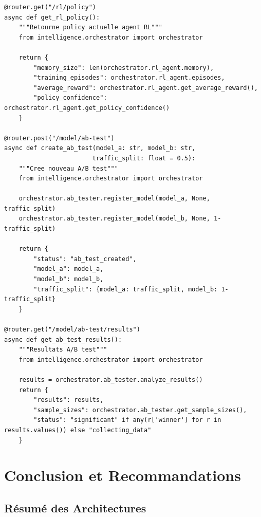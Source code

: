 \documentclass[12pt,a4paper]{article}
\begin{document}
\begin{lstlisting}[caption={api/intelligent\_routes.py}]
@router.get("/rl/policy")
async def get_rl_policy():
    """Retourne policy actuelle agent RL"""
    from intelligence.orchestrator import orchestrator
    
    return {
        "memory_size": len(orchestrator.rl_agent.memory),
        "training_episodes": orchestrator.rl_agent.episodes,
        "average_reward": orchestrator.rl_agent.get_average_reward(),
        "policy_confidence": orchestrator.rl_agent.get_policy_confidence()
    }

@router.post("/model/ab-test")
async def create_ab_test(model_a: str, model_b: str, 
                        traffic_split: float = 0.5):
    """Cree nouveau A/B test"""
    from intelligence.orchestrator import orchestrator
    
    orchestrator.ab_tester.register_model(model_a, None, traffic_split)
    orchestrator.ab_tester.register_model(model_b, None, 1-traffic_split)
    
    return {
        "status": "ab_test_created",
        "model_a": model_a,
        "model_b": model_b,
        "traffic_split": {model_a: traffic_split, model_b: 1-traffic_split}
    }

@router.get("/model/ab-test/results")
async def get_ab_test_results():
    """Resultats A/B test"""
    from intelligence.orchestrator import orchestrator
    
    results = orchestrator.ab_tester.analyze_results()
    return {
        "results": results,
        "sample_sizes": orchestrator.ab_tester.get_sample_sizes(),
        "status": "significant" if any(r['winner'] for r in results.values()) else "collecting_data"
    }
\end{lstlisting}

\section{Conclusion et Recommandations}

\subsection{Résumé des Architectures}
\end{document}
